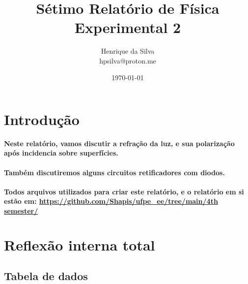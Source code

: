 \documentclass[12pt,twoside, a4paper, twocolumn]{article}
\title{Sétimo  Relatório de Física Experimental 2}
\author{Henrique da Silva \\ hpsilva@proton.me}
\date{\today}
\begin{document}
\maketitle
{}
\newpage
\tableofcontents
\newpage

\section{Introdução}

\paragraph*{Neste relatório, vamos discutir a refração da luz, e sua polarização após incidencia sobre superfícies.}

\paragraph*{Também discutiremos alguns circuitos retificadores com diodos.}

\paragraph*{Todos arquivos utilizados para criar este relatório, e o relatório em si estão em:  \url{https://github.com/Shapis/ufpe_ee/tree/main/4th semester/}}


\section{Reflexão interna total}

\subsection{Tabela de dados}
\end{document}
